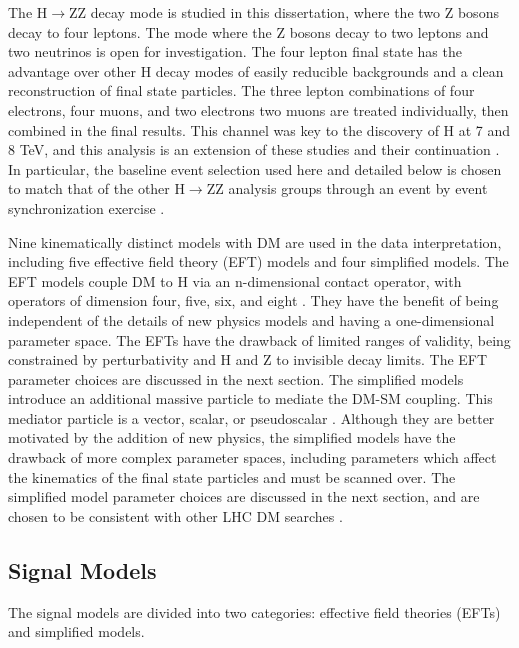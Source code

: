 The H$\rightarrow$ZZ decay mode is studied in this dissertation, where the two Z bosons decay to four leptons. The mode where the Z bosons decay to two leptons and two neutrinos is open for investigation. The four lepton final state has the advantage over other H decay modes of easily reducible backgrounds and a clean reconstruction of final state particles. The three lepton combinations of four electrons, four muons, and two electrons two muons are treated individually, then combined in the final results. This channel was key to the discovery of H \cite{Chatrchyan:2013mxa, ATLAS:2013nma} at 7 and 8 TeV, and this analysis is an extension of these studies and their continuation \cite{CMS-AN-15-277, CMS-PAS-HIG-15-004}. In particular, the baseline event selection used here and detailed below is chosen to match that of the other H$\rightarrow$ZZ analysis groups through an event by event synchronization exercise \cite{synchtwiki}.

Nine kinematically distinct models with DM are used in the data interpretation, including five effective field theory (EFT) models and four simplified models. The EFT models couple DM to H via an n-dimensional contact operator, with operators of dimension four, five, six, and eight \cite{Carpenter:2013xra}. They have the benefit of being independent of the details of new physics models and having a one-dimensional parameter space. The EFTs have the drawback of limited ranges of validity, being constrained by perturbativity and H and Z to invisible decay limits. The EFT parameter choices are discussed in the next section. The simplified models introduce an additional massive particle to mediate the DM-SM coupling. This mediator particle is a vector, scalar, or pseudoscalar \cite{Carpenter:2013xra, Berlin:2014cfa}. Although they are better motivated by the addition of new physics, the simplified models have the drawback of more complex parameter spaces, including parameters which affect the kinematics of the final state particles and must be scanned over. The simplified model parameter choices are discussed in the next section, and are chosen to be consistent with other LHC DM searches \cite{Abercrombie:2015wmb}.

\subsection{Signal Models}

The signal models are divided into two categories: effective field theories (EFTs) and simplified models.


